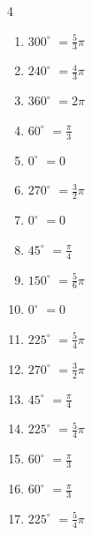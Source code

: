 \begin{multicols}{4}
\begin{enumerate}
  \item $\displaystyle 300^{\circ}$
        $\displaystyle =\frac{5}{3}\pi$

  \item $\displaystyle 240^{\circ}$
        $\displaystyle =\frac{4}{3}\pi$

  \item $\displaystyle 360^{\circ}$
        $\displaystyle =2\pi$

  \item $\displaystyle 60^{\circ}$
        $\displaystyle =\frac{\pi}{3}$

  \item $\displaystyle 0^{\circ}$
        $\displaystyle =0$

  \item $\displaystyle 270^{\circ}$
        $\displaystyle =\frac{3}{2}\pi$

  \item $\displaystyle 0^{\circ}$
        $\displaystyle =0$

\columnbreak %

\resetques

  \item $\displaystyle 45^{\circ}$
        $\displaystyle =\frac{\pi}{4}$

  \item $\displaystyle 150^{\circ}$
        $\displaystyle =\frac{5}{6}\pi$

  \item $\displaystyle 0^{\circ}$
        $\displaystyle =0$

  \item $\displaystyle 225^{\circ}$
        $\displaystyle =\frac{5}{4}\pi$

  \item $\displaystyle 270^{\circ}$
        $\displaystyle =\frac{3}{2}\pi$

  \item $\displaystyle 45^{\circ}$
        $\displaystyle =\frac{\pi}{4}$

  \item $\displaystyle 225^{\circ}$
        $\displaystyle =\frac{5}{4}\pi$

  \item $\displaystyle 60^{\circ}$
        $\displaystyle =\frac{\pi}{3}$

  \item $\displaystyle 60^{\circ}$
        $\displaystyle =\frac{\pi}{3}$

  \item $\displaystyle 225^{\circ}$
        $\displaystyle =\frac{5}{4}\pi$


\end{enumerate}
\end{multicols}

